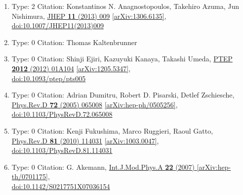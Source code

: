 \documentclass[a4paper,10pt]{article}
\begin{document}
\begin{enumerate}
\begin{enumerate}
  \item Type: 2 Citation: Konstantinos N. Anagnostopoulos, Takehiro Azuma, Jun Nishimura, \href{https://www.doi.org/10.1007/JHEP11(2013)009}{JHEP {\bf 11} (2013) 009}  \href{https://arxiv.org/abs/1306.6135}{[arXiv:1306.6135]},\\\href{https://www.doi.org/10.1007/JHEP11(2013)009}{doi:10.1007/JHEP11(2013)009}
  \item Type: 0 Citation: Thomas Kaltenbrunner
  \item Type: 0 Citation: Shinji Ejiri, Kazuyuki Kanaya, Takashi Umeda, \href{https://www.doi.org/10.1093/ptep/pts005}{PTEP {\bf 2012} (2012) 01A104}  \href{https://arxiv.org/abs/1205.5347}{[arXiv:1205.5347]},\\\href{https://www.doi.org/10.1093/ptep/pts005}{doi:10.1093/ptep/pts005}
  \item Type: 0 Citation: Adrian Dumitru, Robert D. Pisarski, Detlef Zschiesche, \href{https://www.doi.org/10.1103/PhysRevD.72.065008}{Phys.Rev.D {\bf 72} (2005) 065008}  \href{https://arxiv.org/abs/hep-ph/0505256}{[arXiv:hep-ph/0505256]},\\\href{https://www.doi.org/10.1103/PhysRevD.72.065008}{doi:10.1103/PhysRevD.72.065008}
  \item Type: 0 Citation: Kenji Fukushima, Marco Ruggieri, Raoul Gatto, \href{https://www.doi.org/10.1103/PhysRevD.81.114031}{Phys.Rev.D {\bf 81} (2010) 114031}  \href{https://arxiv.org/abs/1003.0047}{[arXiv:1003.0047]},\\\href{https://www.doi.org/10.1103/PhysRevD.81.114031}{doi:10.1103/PhysRevD.81.114031}
  \item Type: 0 Citation: G. Akemann, \href{https://www.doi.org/10.1142/S0217751X07036154}{Int.J.Mod.Phys.A {\bf 22} (2007) }  \href{https://arxiv.org/abs/hep-th/0701175}{[arXiv:hep-th/0701175]},\\\href{https://www.doi.org/10.1142/S0217751X07036154}{doi:10.1142/S0217751X07036154}

\end{enumerate}
\end{enumerate}
\end{document}
